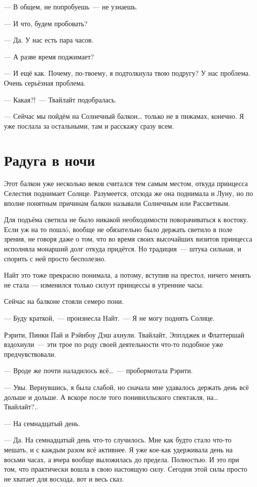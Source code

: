 \documentclass[twoside,a5paper,12pt]{extbook}
\begin{document}
— В общем, не попробуешь — не узнаешь.

— И что, будем пробовать?

— Да. У нас есть пара часов.

— А разве время поджимает?

— И ещё как. Почему, по-твоему, я подтолкнула твою подругу? У нас проблема. Очень серьёзная проблема.

— Какая?! — Твайлайт подобралась.

— Сейчас мы пойдём на Солнечный балкон… только не в пижамах, конечно. Я уже послала за остальными, там и расскажу сразу всем.

\chapter{Радуга в ночи}

Этот балкон уже несколько веков считался тем самым местом, откуда принцесса Селестия поднимает Солнце. Разумеется, отсюда же она поднимала и Луну, но по вполне понятным причинам балкон называли Солнечным или Рассветным.

Для подъёма светила не было никакой необходимости поворачиваться к востоку. Если уж на то пошлó, вообще не обязательно было держать светило в поле зрения, не говоря даже о том, что во время своих высочайших визитов принцесса исполняла монарший долг откуда придётся. Но традиция — штука сильная, и спорить с ней просто бесполезно.

Найт это тоже прекрасно понимала, а потому, вступив на престол, ничего менять не стала — изменился только силуэт принцессы в утренние часы.

Сейчас на балконе стояли семеро пони.

— Буду краткой, — произнесла Найт. — Я не могу поднять Солнце.

Рэрити, Пинки Пай и Рэйнбоу Дэш ахнули. Твайлайт, Эпплджек и Флаттершай вздохнули — эти трое по роду своей деятельности что-то подобное уже предчувствовали.

— Вроде же почти наладилось всё… — пробормотала Рэрити.

— Увы. Вернувшись, я была слабой, но сначала мне удавалось держать день всё дольше и дольше. А вскоре после того понивилльского спектакля, на… Твайлайт?..

— На семнадцатый день.

— Да. На семнадцатый день что-то случилось. Мне как будто стало что-то мешать, и с каждым разом всё активнее. Я уже кое-как удерживала день на восьми часах, а вчера вообще выложилась до предела. Полностью. И это при том, что практически вошла в свою настоящую силу. Сегодня этой силы просто не хватает для восхода, вот и весь сказ.
\end{document}
